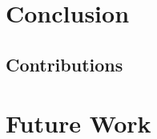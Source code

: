   \label{ch: concl}

\section{Conclusion}

\subsection{Contributions}

\section{Future Work}








